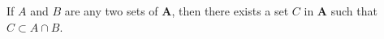 If $A$ and $B$ are any two sets of $\mathbf{A}$, then there exists a set $C$ in $\mathbf{A}$ such that $C \subset A \cap B$.